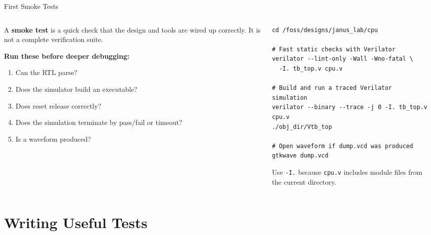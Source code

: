 \documentclass[aspectratio=169,10pt]{beamer}
\begin{document}
\begin{frame}[fragile]{First Smoke Tests}
  \begin{columns}[T]
    \begin{column}{0.50\textwidth}
      A \textbf{smoke test} is a quick check that the design and tools are wired up correctly. It is not a complete verification suite.

      \vspace{0.7em}
      \textbf{Run these before deeper debugging:}
      \begin{enumerate}
        \item Can the RTL parse?
        \item Does the simulator build an executable?
        \item Does reset release correctly?
        \item Does the simulation terminate by pass/fail or timeout?
        \item Is a waveform produced?
      \end{enumerate}
    \end{column}
    \begin{column}{0.46\textwidth}
\begin{lstlisting}[language=Shell]
cd /foss/designs/janus_lab/cpu

# Fast static checks with Verilator
verilator --lint-only -Wall -Wno-fatal \
  -I. tb_top.v cpu.v

# Build and run a traced Verilator simulation
verilator --binary --trace -j 0 -I. tb_top.v cpu.v
./obj_dir/Vtb_top

# Open waveform if dump.vcd was produced
gtkwave dump.vcd
\end{lstlisting}

      \vspace{0.4em}
      \small
      Use \texttt{-I.} because \texttt{cpu.v} includes module files from the current directory.
    \end{column}
  \end{columns}
\end{frame}

\section{Writing Useful Tests}
\end{document}
